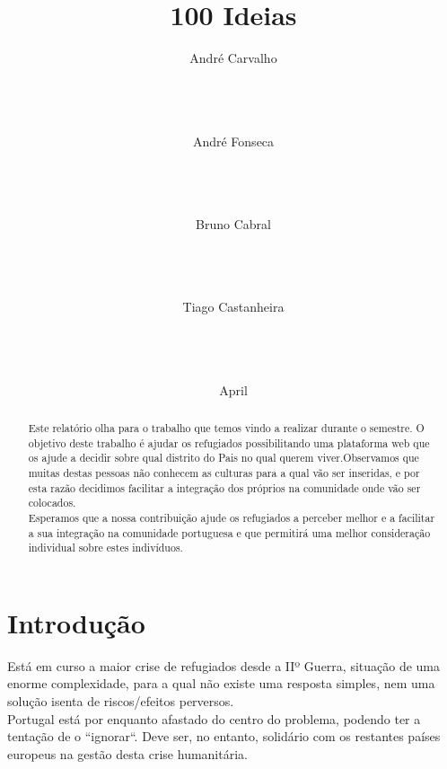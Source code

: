 \documentclass{article}
\title{100 Ideias}
\author{
%
%
\alignauthor
André Carvalho\\
       \affaddr{FCUP - DCC}\\
       \affaddr{Motivation Coach}\\
       \affaddr{Documenter}\\
\and
\alignauthor
André Fonseca\\
       \affaddr{FCUP - DCC}\\
       \affaddr{Task Master}\\
       \affaddr{Developer}\\
\and
\alignauthor Bruno Cabral\\
       \affaddr{FCUP - DCC}\\
       \affaddr{Resources Support}\\
       \affaddr{Researcher}\\
\and  %
\alignauthor Tiago Castanheira\\
       \affaddr{FCUP - DCC}\\
       \affaddr{Mediator}\\
       \affaddr{Architect}\\
}
\date{April}
\begin{document}
\maketitle
\begin{abstract}
    Este relatório olha para o trabalho que temos vindo a realizar durante o semestre. O objetivo deste  trabalho é ajudar os refugiados possibilitando uma plataforma web que os ajude a decidir sobre qual distrito do Pais no qual querem viver.Observamos que muitas destas pessoas não conhecem as culturas para a qual vão ser inseridas, e por esta razão decidimos facilitar a integração dos próprios na comunidade onde vão ser colocados.\\Esperamos que a nossa contribuição ajude os refugiados a perceber melhor e a facilitar a sua integração na comunidade portuguesa e que permitirá uma melhor consideração individual sobre estes indivíduos.
    
    
\end{abstract}
\section{Introdução}



    Está em curso a maior crise de refugiados desde a IIº Guerra, situação de uma enorme complexidade, para a qual não existe uma resposta simples, nem uma solução isenta de riscos/efeitos perversos.\\Portugal está por enquanto afastado do centro do problema, podendo ter a tentação de o “ignorar“. Deve ser, no entanto, solidário com os restantes países europeus na gestão desta crise humanitária.
\end{document}
